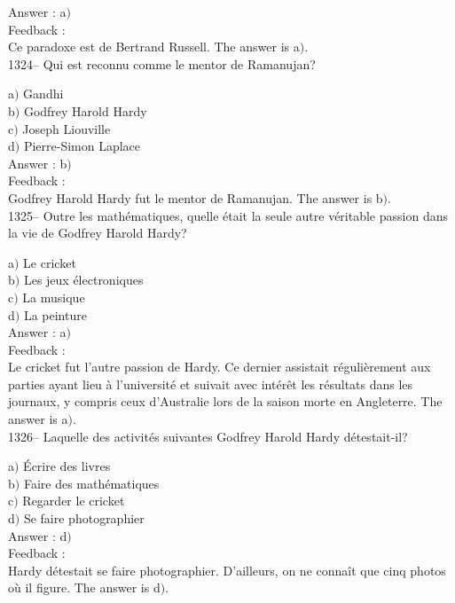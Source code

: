 ﻿\documentclass[letterpaper, 12pt]{article}
\begin{document}
Answer : a$)$\\

Feedback : \\
Ce paradoxe est de Bertrand Russell.
The answer is  a$)$.\\

1324-- Qui est reconnu comme le mentor de Ramanujan?

a$)$ Gandhi \\
b$)$ Godfrey Harold Hardy \\
c$)$ Joseph Liouville \\
d$)$ Pierre-Simon Laplace \\

Answer : b$)$\\

Feedback : \\
Godfrey Harold Hardy fut le mentor de Ramanujan.
The answer is  b$)$.\\

1325-- Outre les math\'ematiques, quelle \'etait la seule autre
v\'eritable passion dans la vie de Godfrey Harold Hardy?

a$)$ Le cricket \\
b$)$ Les jeux \'electroniques \\
c$)$ La musique \\
d$)$ La peinture \\

Answer : a$)$\\

Feedback : \\
Le cricket fut l'autre passion de Hardy. Ce dernier assistait
r\'eguli\`erement aux parties ayant lieu \`a l'universit\'e et
suivait avec int\'er\^et les r\'esultats dans les journaux, y
compris ceux d'Australie lors de la saison morte en Angleterre.
The answer is  a$)$.\\

1326-- Laquelle des activit\'es suivantes Godfrey Harold Hardy
d\'etestait-il?

a$)$ \'Ecrire des livres \\
b$)$ Faire des math\'ematiques \\
c$)$ Regarder le cricket \\
d$)$ Se faire photographier\\

Answer : d$)$\\

Feedback : \\
Hardy d\'etestait se faire photographier. D'ailleurs, on ne
conna\^it que cinq photos o\`u il figure.
The answer is  d$)$.\\
\end{document}
